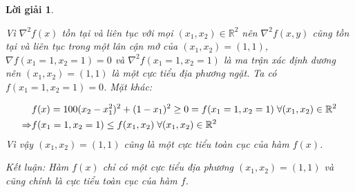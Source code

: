 \documentclass[14pt, a4paper]{article}
\theoremstyle{sltheorem}
\theoremstyle{soltheorem}
\newtheorem*{loigiai}{Lời giải}
\begin{document}
\begin{loigiai}
\begin{enumerate} [wide, labelwidth=!, labelindent=0pt,label=\textbf{\arabic*}.]
            Vì $\nabla^2 f(x)$ tồn tại và liên tục với mọi $(x_1, x_2) \in \mathbb{R}^{2}$ nên $\nabla^2 f(x, y)$ cũng tồn tại và liên tục trong một lân cận mở của $(x_1, x_2)=(1,1)$, $\nabla f(x_1=1, x_2=1)=0$ và $\nabla^2 f(x_1=1, x_2=1)$ là ma trận xác định dương nên $(x_1, x_2)=(1, 1)$ là một cực tiểu địa phương ngặt. Ta có $f(x_1=1, x_2=1)=0$. Mặt khác:

            \begin{equation*}
                \begin{aligned}
                    &f(x)=100(x_2 - x_1^2)^2 + (1-x_1)^2 \geq 0 = f(x_1=1,x_2=1) \thickspace \forall (x_1, x_2) \in \mathbb{R}^{2} \\
                    \Rightarrow&f(x_1=1,x_2=1) \leq f(x_1, x_2) \thickspace \forall (x_1, x_2) \in \mathbb{R}^{2}
                \end{aligned}
            \end{equation*}
            Vì vậy $(x_1, x_2)=(1, 1)$ cũng là một cực tiểu toàn cục của hàm $f(x)$.

            Kết luận: Hàm $f(x)$ chỉ có một cực tiểu địa phương $(x_1, x_2)=(1,1)$ và cũng chính là cực tiểu toàn cục của hàm $f$.
        \end{enumerate}
    \end{loigiai}

    \newpage
    \printbibliography[title={TÀI LIỆU THAM KHẢO}]
\end{document}
